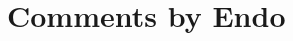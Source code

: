 \documentclass[
10pt, %
a4paper, %
twocolumn, %
landscape %
]{article}
\begin{document}
\section*{Comments by Endo}



\end{document}
